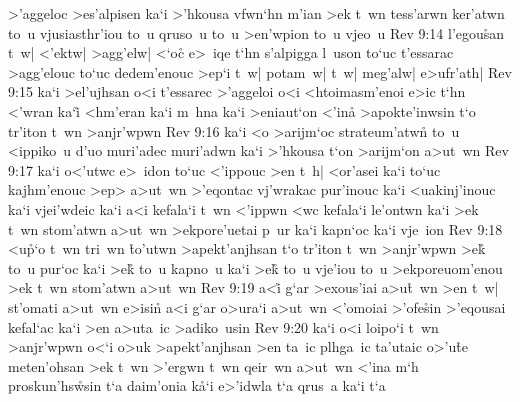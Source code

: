>'aggeloc
>es'alpisen
ka`i
>'hkousa
vfwn`hn
m'ian
>ek
t~wn
tess'arwn
ker'atwn
to~u
vjusiasthr'iou
to~u
qruso~u
to~u
>en'wpion
to~u
vjeo~u\bibvsend
\vs Rev 9:14
l'egou\r{s}an
t~w|
<'ektw|
>agg'elw|
<`oc\r{}
e>~iqe
t`hn
s'alpigga
l~uson
to`uc
t'essarac
>agg'elouc
to`uc
dedem'enouc
>ep`i
t~w|
potam~w|
t~w|
meg'alw|
e>ufr'ath|\bibvsend
\vs Rev 9:15
ka`i
>el'ujhsan
o<i
t'essarec
>'aggeloi
o<i
<htoimasm'enoi
e>ic
t`hn
<'wran
ka`i\r{}
<hm'eran
ka`i
m~hna
ka`i
>eniaut`on
<'in\r{a}
>apokte'inwsin
t`o
tr'iton
t~wn
>anjr'wpwn\bibvsend
\vs Rev 9:16
ka`i
<o
>arijm`oc
strateum'atwn\r{}
to~u
<ippiko~u
d'uo
muri'adec
muri'adwn
ka`i
>'hkousa
t`on
>arijm`on
a>ut~wn\bibvsend
\vs Rev 9:17
ka`i
o<'utwc
e>~idon
to`uc
<'ippouc
>en
t~h|
<or'asei
ka`i
to`uc
kajhm'enouc
>ep>
a>ut~wn
>'eqontac
vj'wrakac
pur'inouc
ka`i
<uakinj'inouc
ka`i
vjei'wdeic
ka`i
a<i
kefala`i
t~wn
<'ippwn
<wc
kefala`i
le'ontwn
ka`i
>ek
t~wn
stom'atwn
a>ut~wn
>ekpore'uetai
p~ur
ka`i
kapn`oc
ka`i
vje~ion\bibvsend
\vs Rev 9:18
<u\r{p}`o
t~wn
tri~wn
\r{t}o'utwn
>apekt'anjhsan
t`o
tr'iton
t~wn
>anjr'wpwn
>e\r{k}
to~u
pur`oc
ka`i
>e\r{k}
to~u
kapno~u
ka`i
>e\r{k}
to~u
vje'iou
to~u
>ekporeuom'enou
>ek
t~wn
stom'atwn
a>ut~wn\bibvsend
\vs Rev 9:19
a<i\r{}
g`ar
>exous'iai
a>u\r{t}~wn
>en
t~w|
st'omati
a>ut~wn
e>isi\r{n}
a<i
g`ar
o>ura`i
a>ut~wn
<'omoiai
>'ofe\r{s}in
>'eqousai
kefal`ac
ka`i
>en
a>uta~ic
>adiko~usin\bibvsend
\vs Rev 9:20
ka`i
o<i
loipo`i
t~wn
>anjr'wpwn
o<`i
o>uk
>apekt'anjhsan
>en
ta~ic
plhga~ic
ta'utaic
o>'u\r{t}e
meten'ohsan
>ek
t~wn
>'ergwn
t~wn
qeir~wn
a>ut~wn
<'ina
m`h
proskun'hs\r{w}sin
t`a
daim'onia
k\r{a}`i
e>'idwla
t`a
qrus~a
ka`i
t`a
